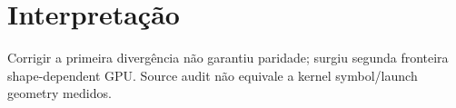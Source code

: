 \section{Interpretação}
Corrigir a primeira divergência não garantiu paridade; surgiu segunda fronteira shape-dependent GPU. Source audit não equivale a kernel symbol/launch geometry medidos.
